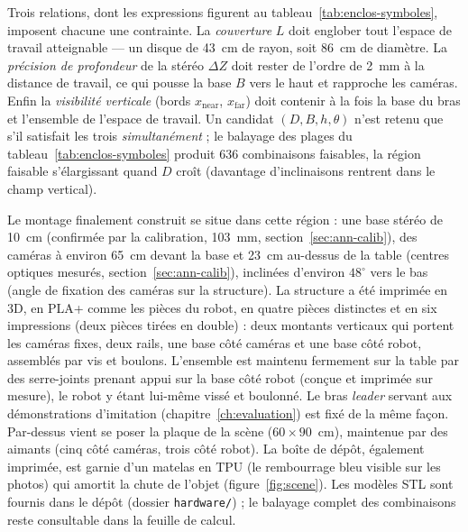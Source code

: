 Trois relations, dont les expressions figurent au tableau~\ref{tab:enclos-symboles}, imposent chacune une contrainte. La \emph{couverture} $L$ doit englober tout l'espace de travail atteignable --- un disque de 43~cm de rayon, soit 86~cm de diamètre. La \emph{précision de profondeur} de la stéréo $\Delta Z$ doit rester de l'ordre de 2~mm à la distance de travail, ce qui pousse la base $B$ vers le haut et rapproche les caméras. Enfin la \emph{visibilité verticale} (bords $x_{\text{near}}$, $x_{\text{far}}$) doit contenir à la fois la base du bras et l'ensemble de l'espace de travail. Un candidat $(D,B,h,\theta)$ n'est retenu que s'il satisfait les trois \emph{simultanément} ; le balayage des plages du tableau~\ref{tab:enclos-symboles} produit 636 combinaisons faisables, la région faisable s'élargissant quand $D$ croît (davantage d'inclinaisons rentrent dans le champ vertical).

Le montage finalement construit se situe dans cette région : une base stéréo de 10~cm (confirmée par la calibration, 103~mm, section~\ref{sec:ann-calib}), des caméras à environ 65~cm devant la base et 23~cm au-dessus de la table (centres optiques mesurés, section~\ref{sec:ann-calib}), inclinées d'environ $48^\circ$ vers le bas (angle de fixation des caméras sur la structure). La structure a été imprimée en 3D, en PLA+ comme les pièces du robot, en quatre pièces distinctes et en six impressions (deux pièces tirées en double) : deux montants verticaux qui portent les caméras fixes, deux rails, une base côté caméras et une base côté robot, assemblés par vis et boulons. L'ensemble est maintenu fermement sur la table par des serre-joints prenant appui sur la base côté robot (conçue et imprimée sur mesure), le robot y étant lui-même vissé et boulonné. Le bras \emph{leader} servant aux démonstrations d'imitation (chapitre~\ref{ch:evaluation}) est fixé de la même façon. Par-dessus vient se poser la plaque de la scène ($60\times90$~cm), maintenue par des aimants (cinq côté caméras, trois côté robot). La boîte de dépôt, également imprimée, est garnie d'un matelas en TPU (le rembourrage bleu visible sur les photos) qui amortit la chute de l'objet (figure~\ref{fig:scene}). Les modèles STL sont fournis dans le dépôt (dossier \texttt{hardware/}) ; le balayage complet des combinaisons reste consultable dans la feuille de calcul.

